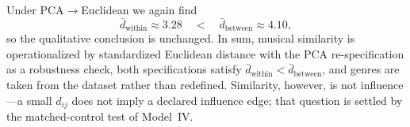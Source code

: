 Under PCA$\to$Euclidean we again find
\[
\bar{d}_{\mathrm{within}} \approx 3.28
\quad < \quad
\bar{d}_{\mathrm{between}} \approx 4.10,
\]
so the qualitative conclusion is unchanged. In sum, musical similarity is
operationalized by standardized Euclidean distance with the PCA
re-specification as a robustness check, both specifications satisfy
$\bar{d}_{\mathrm{within}}<\bar{d}_{\mathrm{between}}$, and genres are
taken from the dataset rather than redefined. Similarity, however, is not
influence---a small $d_{ij}$ does not imply a declared influence edge;
that question is settled by the matched-control test of Model~IV.

